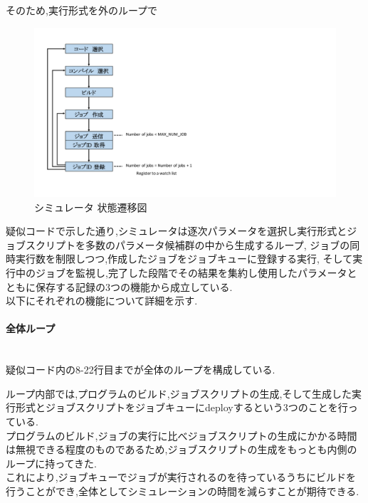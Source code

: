 そのため,実行形式を外のループで
\begin{figure}[htb]
  \begin{center}
    \includegraphics[width=20.0cm]{./images/state.pdf}
    \caption{シミュレータ 状態遷移図}
    \label{fig:test}
  \end{center}
\end{figure}
{\footnotesize

}
疑似コードで示した通り,シミュレータは逐次パラメータを選択し実行形式とジョブスクリプトを多数のパラメータ候補群の中から生成するループ,
ジョブの同時実行数を制限しつつ,作成したジョブをジョブキューに登録する実行,
そして実行中のジョブを監視し,完了した段階でその結果を集約し使用したパラメータとともに保存する記録の3つの機能から成立している.\\
以下にそれぞれの機能について詳細を示す.\\
\paragraph{全体ループ}~\\
疑似コード内の8-22行目までが全体のループを構成している.\\
{\footnotesize

}
ループ内部では,プログラムのビルド,ジョブスクリプトの生成,そして生成した実行形式とジョブスクリプトをジョブキューにdeployするという3つのことを行っている.\\
プログラムのビルド,ジョブの実行に比べジョブスクリプトの生成にかかる時間は無視できる程度のものであるため,ジョブスクリプトの生成をもっとも内側のループに持ってきた.\\
これにより,ジョブキューでジョブが実行されるのを待っているうちにビルドを行うことができ,全体としてシミュレーションの時間を減らすことが期待できる.\\
